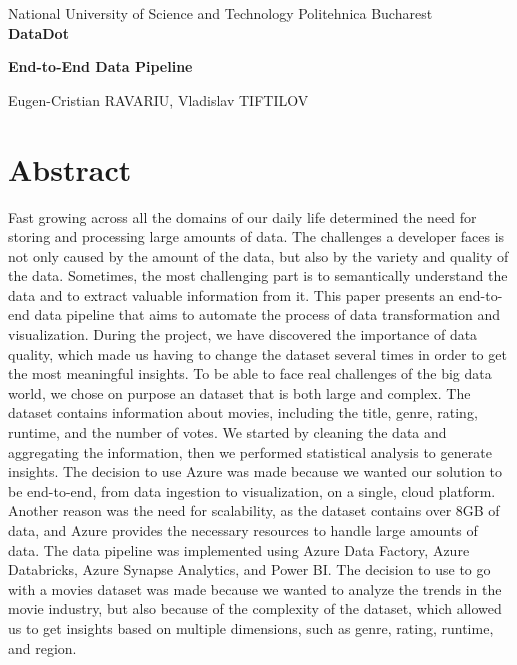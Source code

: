 \documentclass[a4paper,12pt]{article}
\author{Eugen-Cristian RAVARIU, Vladislav TIFTILOV}
\begin{document}
\begin{titlepage}
    \centering
    National University of Science and Technology Politehnica Bucharest\\
    \vfill
    {\bfseries\fontsize{14pt}{14pt} DataDot}\par
    \vspace{0.5cm}
    {\bfseries\fontsize{12pt}{12pt} End-to-End Data Pipeline}\par
    \vspace{2.5cm}
    Eugen-Cristian RAVARIU, Vladislav TIFTILOV\\
    \vfill
    \date{\today}
\end{titlepage}

\section{Abstract}
\label{sec:abstract}

Fast growing across all the domains of our daily life determined the need for storing and processing 
large amounts of data. The challenges a developer faces is not only caused by the amount of the data,
but also by the variety and quality of the data. Sometimes, the most challenging part is to semantically
understand the data and to extract valuable information from it. This paper presents an end-to-end data
pipeline that aims to automate the process of data transformation and visualization. During the project,
we have discovered the importance of data quality, which made us having to change the dataset several times
in order to get the most meaningful insights. To be able to face real challenges of the big data world, we
chose on purpose an dataset that is both large and complex. The dataset contains information about movies,
including the title, genre, rating, runtime, and the number of votes. We started by cleaning the data and
aggregating the information, then we performed statistical analysis to generate insights. The decision to
use Azure was made because we wanted our solution to be end-to-end, from data ingestion to visualization, on
a single, cloud platform. Another reason was the need for scalability, as the dataset contains over 8GB of data,
and Azure provides the necessary resources to handle large amounts of data. The data pipeline was implemented
using Azure Data Factory, Azure Databricks, Azure Synapse Analytics, and Power BI. The decision to use to
go with a movies dataset was made because we wanted to analyze the trends in the movie industry, but also
because of the complexity of the dataset, which allowed us to get insights based on multiple dimensions, such
as genre, rating, runtime, and region.
\end{document}
